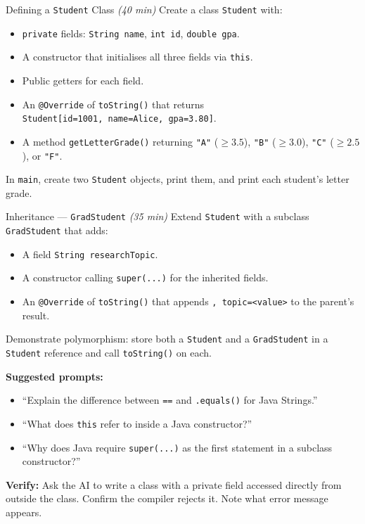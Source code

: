 \documentclass[11pt]{article}
\begin{document}
\begin{labexercise}{Defining a \texttt{Student} Class \hfill {\small \itshape (40 min)}}
Create a class \texttt{Student} with:
\begin{itemize}[leftmargin=*,nosep]
  \item \texttt{private} fields: \texttt{String name}, \texttt{int id}, \texttt{double gpa}.
  \item A constructor that initialises all three fields via \texttt{this}.
  \item Public getters for each field.
  \item An \texttt{@Override} of \texttt{toString()} that returns\\
        \texttt{Student[id=1001, name=Alice, gpa=3.80]}.
  \item A method \texttt{getLetterGrade()} returning \texttt{"A"} ($\geq 3.5$), \texttt{"B"} ($\geq 3.0$), \texttt{"C"} ($\geq 2.5$), or \texttt{"F"}.
\end{itemize}
In \texttt{main}, create two \texttt{Student} objects, print them, and print each student's letter grade.
\end{labexercise}

\begin{labexercise}{Inheritance --- \texttt{GradStudent} \hfill {\small \itshape (35 min)}}
Extend \texttt{Student} with a subclass \texttt{GradStudent} that adds:
\begin{itemize}[leftmargin=*,nosep]
  \item A field \texttt{String researchTopic}.
  \item A constructor calling \texttt{super(...)} for the inherited fields.
  \item An \texttt{@Override} of \texttt{toString()} that appends \texttt{, topic=<value>} to the parent's result.
\end{itemize}
Demonstrate polymorphism: store both a \texttt{Student} and a \texttt{GradStudent} in a
\texttt{Student} reference and call \texttt{toString()} on each.
\end{labexercise}

\begin{aicollab}
\textbf{Suggested prompts:}
\begin{itemize}[leftmargin=*,nosep]
  \item ``Explain the difference between \texttt{==} and \texttt{.equals()} for Java Strings.''
  \item ``What does \texttt{this} refer to inside a Java constructor?''
  \item ``Why does Java require \texttt{super(...)} as the first statement in a subclass constructor?''
\end{itemize}
\medskip\textbf{Verify:} Ask the AI to write a class with a private field accessed directly from
outside the class. Confirm the compiler rejects it. Note what error message appears.
\end{aicollab}
\end{document}
